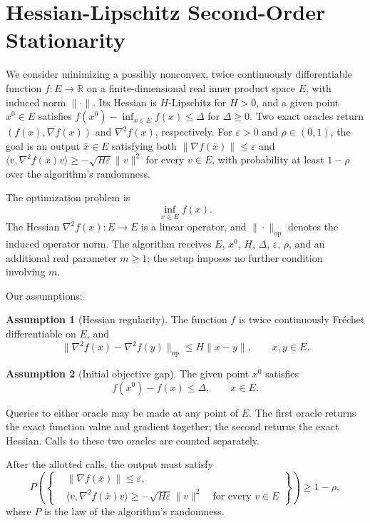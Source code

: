 \documentclass[10pt]{article}
\theoremstyle{definition}
\newtheorem{assumption}{Assumption}
\begin{document}
\section*{Hessian-Lipschitz Second-Order Stationarity}
We consider minimizing a possibly nonconvex, twice continuously differentiable function $f:E\to\mathbb{R}$ on a finite-dimensional real inner product space $E$, with induced norm $\|\cdot\|$. Its Hessian is $H$-Lipschitz for $H>0$, and a given point $x^0\in E$ satisfies $f(x^0)-\inf_{x\in E}f(x)\leq\Delta$ for $\Delta\geq0$. Two exact oracles return $(f(x),\nabla f(x))$ and $\nabla^2 f(x)$, respectively. For $\varepsilon>0$ and $\rho\in(0,1)$, the goal is an output $\bar{x}\in E$ satisfying both $\|\nabla f(\bar{x})\|\leq\varepsilon$ and $\langle v,\nabla^2 f(\bar{x})v\rangle\geq-\sqrt{H\varepsilon}\|v\|^2$ for every $v\in E$, with probability at least $1-\rho$ over the algorithm's randomness.

The optimization problem is
\[
\inf_{x\in E} f(x).
\]
The Hessian $\nabla^2 f(x):E\to E$ is a linear operator, and $\|\cdot\|_{\mathrm{op}}$ denotes the induced operator norm. The algorithm receives $E$, $x^0$, $H$, $\Delta$, $\varepsilon$, $\rho$, and an additional real parameter $m\geq1$; the setup imposes no further condition involving $m$.

Our assumptions:
\begin{assumption}[Hessian regularity]
The function $f$ is twice continuously Fr\'echet differentiable on $E$, and
\[
\|\nabla^2 f(x)-\nabla^2 f(y)\|_{\mathrm{op}}
\leq H\|x-y\|,
\qquad x,y\in E.
\]
\end{assumption}

\begin{assumption}[Initial objective gap]
The given point $x^0$ satisfies
\[
f(x^0)-f(x)\leq\Delta,
\qquad x\in E.
\]
\end{assumption}

Queries to either oracle may be made at any point of $E$. The first oracle returns the exact function value and gradient together; the second returns the exact Hessian. Calls to these two oracles are counted separately.

After the allotted calls, the output must satisfy
\[
P\!\left(
\left\{
\begin{aligned}
&\|\nabla f(\bar{x})\|\leq\varepsilon,\\
&\langle v,\nabla^2 f(\bar{x})v\rangle
\geq-\sqrt{H\varepsilon}\|v\|^2
\quad\text{for every }v\in E
\end{aligned}
\right\}
\right)\geq1-\rho,
\]
where $P$ is the law of the algorithm's randomness.
\end{document}
